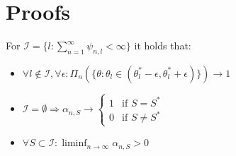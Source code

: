 \section{Proofs}\label{section:txts_proofs}
\textbf{}
For $\mathcal{I} = \{l: \sum_{n=1}^\infty \psi_{n, l} < \infty\}$ it holds
    that:
\begin{itemize}
  \item $\forall l \notin \mathcal{I}, \forall \epsilon: \Pi_n(\{\theta:
      \theta_l \in (\theta^*_l - \epsilon, \theta^*_l + \epsilon)\})
      \rightarrow 1$
  \item $\mathcal{I} = \emptyset \Rightarrow
  \alpha_{n, S} \rightarrow \begin{cases}
    1 & \text{if } S = S^*\\
    0 & \text{if } S \neq S^*
  \end{cases}$
  \item $\forall S \subset \mathcal{I}: \liminf_{n \rightarrow \infty}
      \alpha_{n, S} > 0$
\end{itemize}

